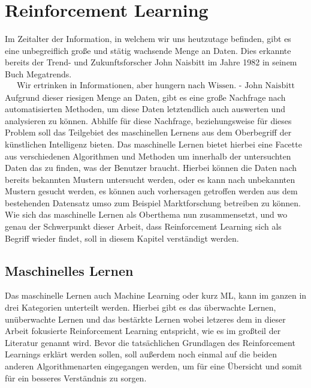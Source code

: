 \documentclass[]{iat}
\begin{document}
\chapter{Reinforcement Learning} \label{sec:reinforcement_learning}
Im Zeitalter der Information, in welchem wir uns heutzutage befinden, gibt es eine unbegreiflich große und stätig wachsende Menge an Daten. Dies erkannte bereits der Trend- und Zukunftsforscher John Naisbitt im Jahre 1982 in seinem Buch Megatrends.
\begin{align*}
    \text{Wir ertrinken in Informationen, aber hungern nach Wissen. - John Naisbitt}
\end{align*}
Aufgrund dieser riesigen Menge an Daten, gibt es eine große Nachfrage nach automatisierten Methoden, um diese Daten letztendlich auch auswerten und analysieren zu können. Abhilfe für diese Nachfrage, beziehungsweise für dieses Problem soll das Teilgebiet des maschinellen Lernens aus dem Oberbegriff der künstlichen Intelligenz bieten. Das maschinelle Lernen bietet hierbei eine Facette aus verschiedenen Algorithmen und Methoden um innerhalb der untersuchten Daten das zu finden, was der Benutzer braucht. Hierbei können die Daten nach bereits bekannten Mustern untersucht werden, oder es kann nach unbekannten Mustern gesucht werden, es können auch vorhersagen getroffen werden aus dem bestehenden Datensatz umso zum Beispiel Marktforschung betreiben zu können. Wie sich das maschinelle Lernen als Oberthema nun zusammensetzt, und wo genau der Schwerpunkt dieser Arbeit, dass Reinforcement Learning sich als Begriff wieder findet, soll in diesem Kapitel verständigt werden.

\section{Maschinelles Lernen} \label{sec:machine_learning}
Das maschinelle Lernen auch Machine Learning oder kurz ML, kann im ganzen in drei Kategorien unterteilt werden. Hierbei gibt es das überwachte Lernen, unüberwachte Lernen und das bestärkte Lernen wobei letzeres dem in dieser Arbeit fokusierte Reinforcement Learning entspricht, wie es im großteil der Literatur genannt wird. Bevor die tatsächlichen Grundlagen des Reinforcement Learnings erklärt werden sollen, soll außerdem noch einmal auf die beiden anderen Algorithmenarten eingegangen werden, um für eine Übersicht und somit für ein besseres Verständnis zu sorgen.
\end{document}
